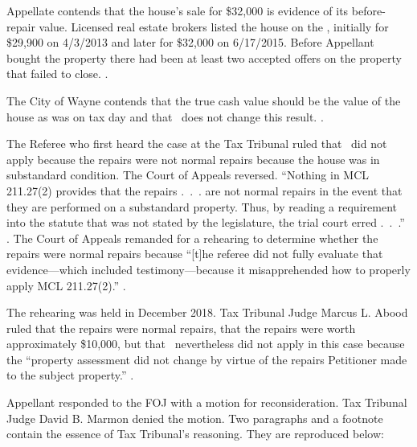 \documentclass[12pt,\documentclassflag]{michiganCourtOfAppealsBrief}
\begin{document}
Appellate contends that the house's sale for \$32,000 is evidence of its before-repair value. Licensed real estate brokers listed the house on the \MLS, initially for \$29,900 on 4/3/2013 and later for \$32,000 on 6/17/2015. Before Appellant bought the property there had been at least two accepted offers on the property that failed to close. \mlsHistory[]. 

The City of Wayne contends that the true cash value should be the value of the house as was on tax day and that \mathieuGast\ does not change this result. \foj[4].

The Referee who first heard the case at the Tax Tribunal ruled that \mathieuGast\ did not apply because the repairs were not normal repairs because the house was in substandard condition. The Court of Appeals reversed. ``Nothing in MCL 211.27(2) provides that the repairs .~.~. are not normal repairs in the event that they are performed on a substandard property. Thus, by reading a requirement into the statute that was not stated by the legislature, the trial court erred .~.~.'' . The Court of Appeals remanded for a rehearing to determine whether the repairs were normal repairs because ``[t]he referee did not fully evaluate that evidence---which included testimony---because it misapprehended how to properly apply MCL 211.27(2).'' .

The rehearing was held in December 2018. Tax Tribunal Judge Marcus L. Abood ruled that the repairs were normal repairs, that the repairs were worth approximately \$10,000, but that \mathieuGast\ nevertheless did not apply in this case because the ``property assessment did not change by virtue of the repairs Petitioner made to the subject property.'' \foj[5].

Appellant responded to the FOJ with a motion for reconsideration. Tax Tribunal Judge David B. Marmon denied the motion. Two paragraphs and a footnote contain the essence of Tax Tribunal's reasoning. They are reproduced below:
\end{document}
